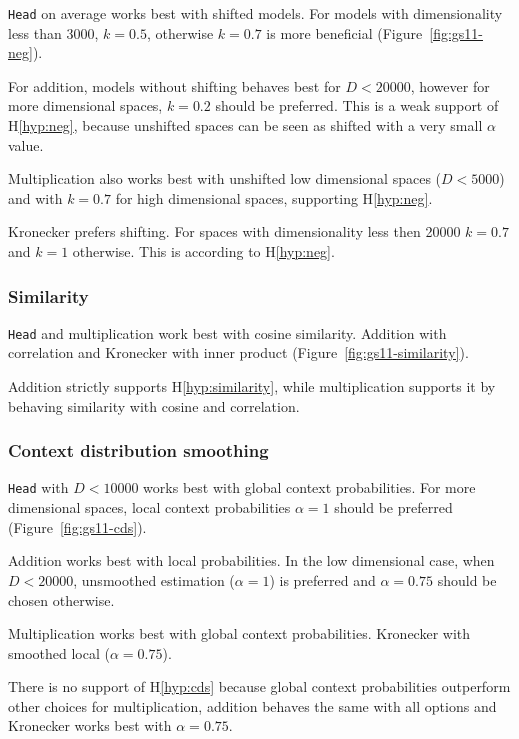 \texttt{Head} on average works best with shifted models. For models with dimensionality less than 3000, $k = 0.5$, otherwise $k = 0.7$ is more beneficial (Figure~\ref{fig:gs11-neg}).

For addition, models without shifting behaves best for $D < 20000$, however for more dimensional spaces, $k = 0.2$ should be preferred. This is a weak support of H\ref{hyp:neg}, because unshifted spaces can be seen as shifted with a very small $\alpha$ value.

Multiplication also works best with unshifted low dimensional spaces ($D < 5000$) and with $k = 0.7$ for high dimensional spaces, supporting H\ref{hyp:neg}.

Kronecker prefers shifting. For spaces with dimensionality less then 20000 $k = 0.7$ and $k = 1$ otherwise. This is according to H\ref{hyp:neg}.

\subsubsection{Similarity}



\texttt{Head} and multiplication work best with cosine similarity. Addition with correlation and Kronecker with inner product (Figure~\ref{fig:gs11-similarity}).

Addition strictly supports H\ref{hyp:similarity}, while multiplication supports it by behaving similarity with cosine and correlation.

\subsubsection{Context distribution smoothing}

\texttt{Head} with $D < 10000$ works best with global context probabilities. For more dimensional spaces, local context probabilities $\alpha = 1$ should be preferred (Figure~\ref{fig:gs11-cds}).

Addition works best with local probabilities. In the low dimensional case, when $D < 20000$, unsmoothed estimation ($\alpha = 1$) is preferred and $\alpha = 0.75$ should be chosen otherwise.

Multiplication works best with global context probabilities. Kronecker with smoothed local ($\alpha = 0.75$).

There is no support of H\ref{hyp:cds} because global context probabilities outperform other choices for multiplication, addition behaves the same with all options and Kronecker works best with $\alpha = 0.75$.

